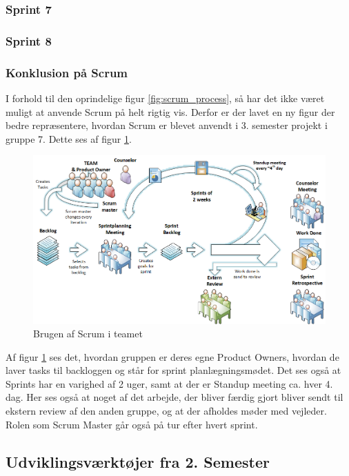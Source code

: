 \documentclass[a4paper,12pt,fleqn,oneside]{article}
\begin{document}
\subsubsection{Sprint 7}

\subsubsection{Sprint 8}
\subsubsection{Konklusion på Scrum}
I forhold til den oprindelige figur \ref{fig:scrum_process}, så har det ikke været muligt at anvende Scrum på helt rigtig vis. Derfor er der lavet en ny figur der bedre repræsentere, hvordan Scrum er blevet anvendt i 3. semester projekt i gruppe 7. Dette ses af figur \ref{fig:Scrum_usage}.
\begin{figure}[H]
    \centering
    \includegraphics[width=\textwidth]{Processdokument/graphics/Scrum_usage.png}
    \caption{Brugen af Scrum i teamet}
    \label{fig:Scrum_usage}
\end{figure}
Af figur \ref{fig:Scrum_usage} ses det, hvordan gruppen er deres egne Product Owners, hvordan de laver tasks til backloggen og står for sprint planlægningsmødet. Det ses også at Sprints har en varighed af 2 uger, samt at der er Standup meeting ca. hver 4. dag. Her ses også at noget af det arbejde, der bliver færdig gjort bliver sendt til ekstern review af den anden gruppe, og at der afholdes møder med vejleder. Rolen som Scrum Master går også på tur efter hvert sprint.

\subsection{Udviklingsværktøjer fra 2. Semester}
\end{document}
